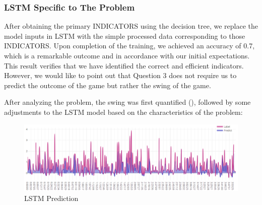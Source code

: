 \subsubsection{LSTM Specific to The Problem}
After obtaining the primary INDICATORS using the decision tree, we replace the model inputs in LSTM with the simple processed data corresponding to those INDICATORS. Upon completion of the training, we achieved an accuracy of 0.7, which is a remarkable outcome and in accordance with our initial expectations. This result verifies that we have identified the correct and efficient indicators. However, we would like to point out that Question 3 does not require us to predict the outcome of the game but rather the swing of the game.\par
After analyzing the problem, the swing was first quantified (), followed by some adjustments to the LSTM model based on the characteristics of the problem: \par 
\begin{figure}[bt!]
    \centering
    \includegraphics[width=1\linewidth]{figure/lstm2.png}
    \caption{\centering LSTM Prediction}
    \label{fig:lstm2}
\end{figure}

